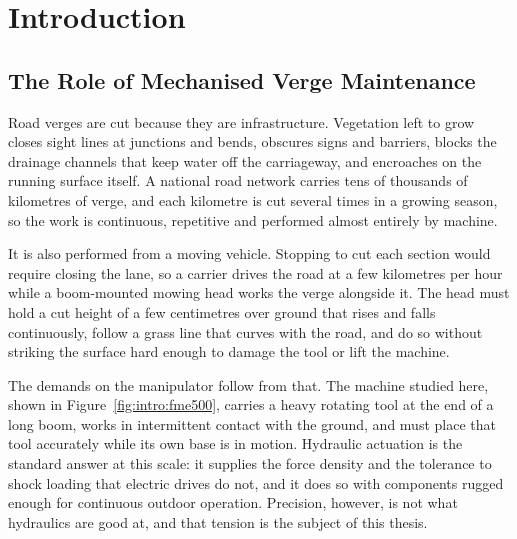 \chapter{Introduction}
\label{chap:introduction}

\section{The Role of Mechanised Verge Maintenance}
\label{sec:intro:verge}

Road verges are cut because they are infrastructure. Vegetation left to grow
closes sight lines at junctions and bends, obscures signs and barriers, blocks
the drainage channels that keep water off the carriageway, and encroaches on the
running surface itself. A national road network carries tens of thousands of
kilometres of verge, and each kilometre is cut several times in a growing
season, so the work is continuous, repetitive and performed almost entirely by
machine.

It is also performed from a moving vehicle. Stopping to cut each section would
require closing the lane, so a carrier drives the road at a few kilometres per
hour while a boom-mounted mowing head works the verge alongside it. The head
must hold a cut height of a few centimetres over ground that rises and falls
continuously, follow a grass line that curves with the road, and do so without
striking the surface hard enough to damage the tool or lift the machine.

The demands on the manipulator follow from that. The machine studied here,
shown in Figure~\ref{fig:intro:fme500}, carries a heavy rotating tool at the end
of a long boom, works in intermittent contact with the ground,
and must place that tool accurately while its own base is in motion. Hydraulic
actuation is the standard answer at this scale: it supplies the force density
and the tolerance to shock loading that electric drives do not, and it does so
with components rugged enough for continuous outdoor operation. Precision,
however, is not what hydraulics are good at, and that tension is the subject of
this thesis.

